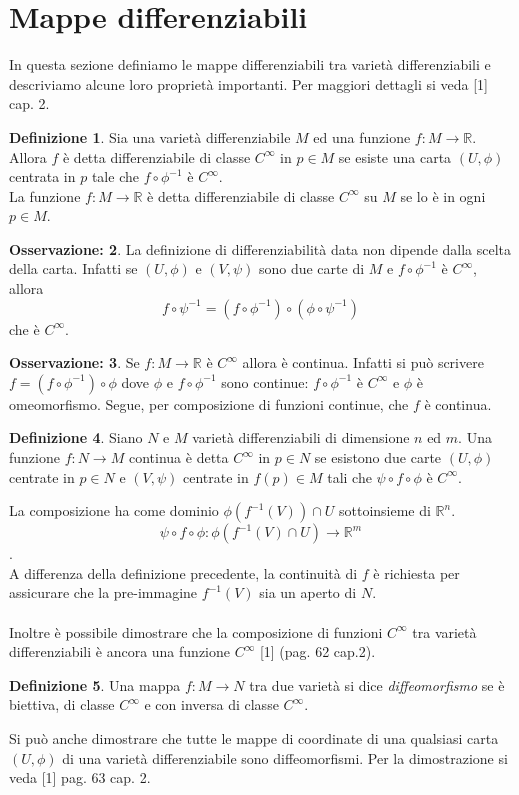 \documentclass[12pt,a4paper]{report}
\theoremstyle{definition}
\newtheorem{Def}{Definizione}[chapter]
\theoremstyle{Theorem}
\theoremstyle{definition}
\theoremstyle{definition}
\theoremstyle{definition}
\newtheorem{Obs}[Def]{Osservazione:}
\begin{document}
\section{Mappe differenziabili}
In questa sezione definiamo le mappe differenziabili tra varietà differenziabili e descriviamo alcune loro proprietà importanti. Per maggiori dettagli si veda [1] cap. 2.
\begin{Def}
	Sia una varietà differenziabile $M$ ed una funzione $f:M\rightarrow\mathbb{R}$. Allora $f$ è detta differenziabile di classe $C^\infty$ in $p\in M$ se esiste una carta $(U,\phi)$ centrata in $p$ tale che $f\circ \phi^{-1}$ è $C^\infty$.\\
	La funzione $f:M\rightarrow \mathbb{R}$ è detta differenziabile di classe $C^\infty$ su $M$ se lo è in ogni $p\in M$.
\end{Def}
\begin{Obs}
	La definizione di differenziabilità data non dipende dalla scelta della carta. Infatti se $(U,\phi)$ e $(V,\psi)$ sono due carte di $M$ e $f\circ\phi^{-1}$ è $C^\infty$, allora $$f\circ\psi^{-1}=(f\circ\phi^{-1})\circ(\phi\circ\psi^{-1})$$ che è $C^\infty$.
\end{Obs}
\begin{Obs}
	Se $f:M\rightarrow \mathbb{R}$ è $C^\infty$ allora è continua. Infatti si può scrivere $f=(f\circ\phi^{-1})\circ \phi$ dove $\phi$ e $f\circ\phi^{-1}$ sono continue: $f\circ\phi^{-1}$ è $C^\infty$ e $\phi$ è omeomorfismo. Segue, per composizione di funzioni continue, che $f$ è continua.\\
\end{Obs}
\begin{Def}
	Siano $N$ e $M$ varietà differenziabili di dimensione $n$ ed $m$. Una funzione $f:N\rightarrow M$ continua è detta $C^\infty$ in $p\in N$ se esistono due carte $(U,\phi)$ centrate in $p\in N$ e $(V,\psi)$ centrate in $f(p)\in M$ tali che $\psi\circ f\circ \phi$ è $C^\infty$.
\end{Def}
La composizione ha come dominio $\phi(f^{-1}(V))\cap U$ sottoinsieme di $\mathbb{R}^n$. $$\psi\circ f\circ \phi:\phi(f^{-1}(V)\cap U)\rightarrow \mathbb{R}^m$$.\\
A differenza della definizione precedente, la continuità di $f$ è richiesta per assicurare che la pre-immagine $f^{-1}(V)$ sia un aperto di $N$.\\
\\
Inoltre è possibile dimostrare che la composizione di funzioni $C^\infty$ tra varietà differenziabili è ancora una funzione $C^\infty$ [1] (pag. 62 cap.2). 
\begin{Def}
	Una mappa $f:M\rightarrow N$ tra due varietà si dice \textit{diffeomorfismo} se è biettiva, di classe $C^\infty$ e con inversa di classe $C^\infty$.
\end{Def}
Si può anche dimostrare che tutte le mappe di coordinate di una qualsiasi carta $(U,\phi)$ di una varietà differenziabile sono diffeomorfismi. Per la dimostrazione si veda [1] pag. 63 cap. 2.
\end{document}
